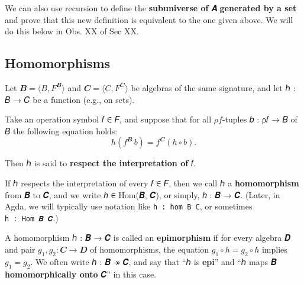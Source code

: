 \documentclass[sigplan,screen]{acmart}
\begin{document}
We can also use recursion to define the \textbf{subuniverse of} 𝑨 \textbf{generated by a set} and prove that this new definition is equivalent to the one given above. We will do this below in Obs. XX of Sec XX. %




\subsection{Homomorphisms}\label{homomorphisms}
Let \(𝑩 = ⟨B, F^𝑩⟩\) and \(𝑪 = ⟨C, F^𝑪⟩\) be algebras of the same signature, and let ℎ : 𝐵 → 𝐶 be a function (e.g., on sets).

Take an operation symbol 𝑓 ∈ 𝐹, and suppose that for all \(ρ f\)-tuples 𝑏 : ρ𝑓 → 𝐵 of 𝐵 the following equation holds:
\[h (f^𝑩 \, b) = f^𝑪 (h ∘ b).\]

Then ℎ is said to \textbf{respect the interpretation of} 𝑓.

If ℎ respects the interpretation of every 𝑓 ∈ 𝐹, then we call ℎ a \textbf{homomorphism} from 𝑩 to 𝑪, and we write ℎ ∈ Hom(𝑩, 𝑪), or simply, ℎ : 𝑩 → 𝑪. (Later, in Agda, we will typically use notation like \texttt{h\ :\ hom\ B\ C}, or sometimes \texttt{h\ :\ Hom\ 𝑩\ 𝑪}.)

A homomorphism ℎ : 𝑩 → 𝑪 is called an \textbf{epimorphism} if for every algebra 𝑫 and pair \(g_1, g_2: 𝑪 → 𝑫\) of homomorphisms, the equation \(g_1 ∘ h = g_2 ∘ h\) implies \(g_1 = g_2\). We often write ℎ : 𝑩 ↠ 𝑪, and say that ``ℎ is \textbf{epi}'' and ``ℎ maps 𝑩 \textbf{homomorphically onto} 𝑪'' in this case.
\end{document}
